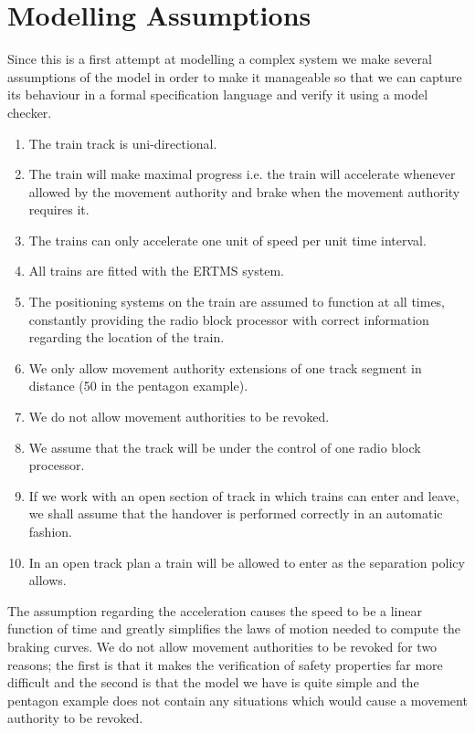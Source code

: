 \section{Modelling Assumptions}
Since this is a first attempt at modelling a complex system we make several assumptions of the model in order to make it manageable so that we can capture its behaviour in a formal specification language and verify it using a model checker.
%
\begin{enumerate}

\item The train track is uni-directional.

\item The train will make maximal progress i.e. the train will accelerate whenever allowed by the movement authority and brake when the movement authority requires it.

\item The trains can only accelerate one unit of speed per unit time interval.

\item All trains are fitted with the ERTMS system.

\item The positioning systems on the train are assumed to function at all times, constantly providing the radio block processor with correct information regarding the location of the train.

\item We only allow movement authority extensions of one track segment in distance (50 in the pentagon example).

\item We do not allow movement authorities to be revoked.

\item We assume that the track will be under the control of one radio block processor.

\item If we work with an open section of track in which trains can enter and leave, we shall assume that the handover is performed correctly in an automatic fashion.

\item In an open track plan a train will be allowed to enter as the separation policy allows.
\end{enumerate}
%
The assumption regarding the acceleration causes the speed to be a linear function of time and greatly simplifies the laws of motion needed to compute the braking curves.   We do not allow movement authorities to be revoked for two reasons; the first is that it makes the verification of safety properties far more difficult and the second is that the model we have is quite simple and the pentagon example does not contain any situations which would cause a movement authority to be revoked.
%
